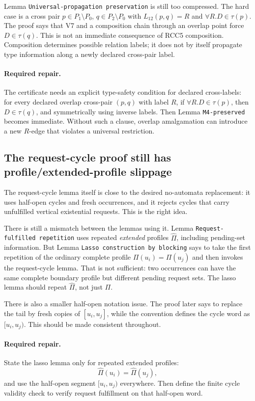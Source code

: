 \documentclass[11pt]{article}
\begin{document}
Lemma \texttt{Universal-propagation preservation} is still too compressed.  The
hard case is a cross pair $p\in P_1\setminus P_0$, $q\in P_2\setminus P_0$ with
$L_{12}(p,q)=R$ and $\forall R.D\in\tau(p)$.  The proof says that V7 and a
composition chain through an overlap point force $D\in\tau(q)$.  This is not an
immediate consequence of RCC5 composition.  Composition determines possible
relation labels; it does not by itself propagate type information along a newly
declared cross-pair label.

\paragraph{Required repair.}
The certificate needs an explicit type-safety condition for declared cross-labels:
for every declared overlap cross-pair $(p,q)$ with label $R$, if
$\forall R.D\in\tau(p)$, then $D\in\tau(q)$, and symmetrically using inverse
labels.  Then Lemma \texttt{M4-preserved} becomes immediate.  Without such a
clause, overlap amalgamation can introduce a new $R$-edge that violates a
universal restriction.

\subsection{The request-cycle proof still has profile/extended-profile slippage}

The request-cycle lemma itself is close to the desired no-automata replacement:
it uses half-open cycles and fresh occurrences, and it rejects cycles that carry
unfulfilled vertical existential requests.  This is the right idea.

There is still a mismatch between the lemmas using it.  Lemma
\texttt{Request-fulfilled repetition} uses repeated \emph{extended} profiles
$\widehat\Pi$, including pending-set information.  But Lemma \texttt{Lasso
construction by blocking} says to take the first repetition of the ordinary
complete profile $\Pi(u_i)=\Pi(u_j)$ and then invokes the request-cycle lemma.
That is not sufficient: two occurrences can have the same complete boundary
profile but different pending request sets.  The lasso lemma should repeat
$\widehat\Pi$, not just $\Pi$.

There is also a smaller half-open notation issue.  The proof later says to
replace the tail by fresh copies of $[u_i,u_j]$, while the convention defines
the cycle word as $[u_i,u_j)$.  This should be made consistent throughout.

\paragraph{Required repair.}
State the lasso lemma only for repeated extended profiles:
\[
  \widehat\Pi(u_i)=\widehat\Pi(u_j),
\]
and use the half-open segment $[u_i,u_j)$ everywhere.  Then define the finite
cycle validity check to verify request fulfillment on that half-open word.
\end{document}
